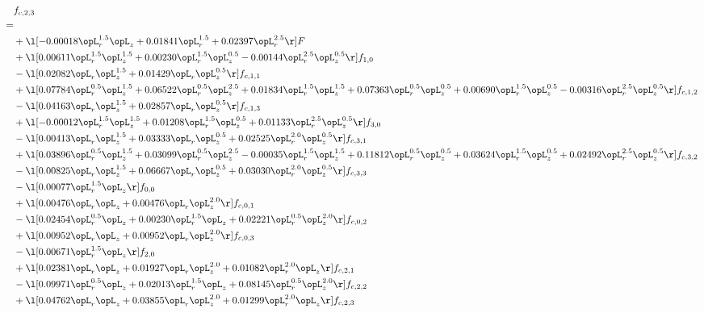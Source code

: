 \begin{alignat}{2} 
\label{eq:f_23_1} 
& f_{c,2,3} \nonumber \\ 
 = \\ 
& + \l[  -0.00018 \opL_r^{1.5} \opL_z +  0.01841 \opL_r^{1.5} +  0.02397 \opL_r^{2.5}  \r] F \nonumber \\ 
& + \l[  0.00611 \opL_r^{1.5} \opL_z^{1.5} +  0.00230 \opL_r^{1.5} \opL_z^{0.5}   -0.00144 \opL_r^{2.5} \opL_z^{0.5}  \r] f_{1,0} \nonumber \\ 
& - \l[  0.02082 \opL_r \opL_z^{1.5} +  0.01429 \opL_r \opL_z^{0.5}  \r] f_{c,1,1} \nonumber \\ 
& + \l[  0.07784 \opL_r^{0.5} \opL_z^{1.5} +  0.06522 \opL_r^{0.5} \opL_z^{2.5} +  0.01834 \opL_r^{1.5} \opL_z^{1.5} +  0.07363 \opL_r^{0.5} \opL_z^{0.5} +  0.00690 \opL_r^{1.5} \opL_z^{0.5}   -0.00316 \opL_r^{2.5} \opL_z^{0.5}  \r] f_{c,1,2} \nonumber \\ 
& - \l[  0.04163 \opL_r \opL_z^{1.5} +  0.02857 \opL_r \opL_z^{0.5}  \r] f_{c,1,3} \nonumber \\ 
& + \l[  -0.00012 \opL_r^{1.5} \opL_z^{1.5} +  0.01208 \opL_r^{1.5} \opL_z^{0.5} +  0.01133 \opL_r^{2.5} \opL_z^{0.5}  \r] f_{3,0} \nonumber \\ 
& - \l[  0.00413 \opL_r \opL_z^{1.5} +  0.03333 \opL_r \opL_z^{0.5} +  0.02525 \opL_r^{2.0} \opL_z^{0.5}  \r] f_{c,3,1} \nonumber \\ 
& + \l[  0.03896 \opL_r^{0.5} \opL_z^{1.5} +  0.03099 \opL_r^{0.5} \opL_z^{2.5}   -0.00035 \opL_r^{1.5} \opL_z^{1.5} +  0.11812 \opL_r^{0.5} \opL_z^{0.5} +  0.03624 \opL_r^{1.5} \opL_z^{0.5} +  0.02492 \opL_r^{2.5} \opL_z^{0.5}  \r] f_{c,3,2} \nonumber \\ 
& - \l[  0.00825 \opL_r \opL_z^{1.5} +  0.06667 \opL_r \opL_z^{0.5} +  0.03030 \opL_r^{2.0} \opL_z^{0.5}  \r] f_{c,3,3} \nonumber \\ 
& - \l[  0.00077 \opL_r^{1.5} \opL_z  \r] f_{0,0} \nonumber \\ 
& + \l[  0.00476 \opL_r \opL_z +  0.00476 \opL_r \opL_z^{2.0}  \r] f_{c,0,1} \nonumber \\ 
& - \l[  0.02454 \opL_r^{0.5} \opL_z +  0.00230 \opL_r^{1.5} \opL_z +  0.02221 \opL_r^{0.5} \opL_z^{2.0}  \r] f_{c,0,2} \nonumber \\ 
& + \l[  0.00952 \opL_r \opL_z +  0.00952 \opL_r \opL_z^{2.0}  \r] f_{c,0,3} \nonumber \\ 
& - \l[  0.00671 \opL_r^{1.5} \opL_z  \r] f_{2,0} \nonumber \\ 
& + \l[  0.02381 \opL_r \opL_z +  0.01927 \opL_r \opL_z^{2.0} +  0.01082 \opL_r^{2.0} \opL_z  \r] f_{c,2,1} \nonumber \\ 
& - \l[  0.09971 \opL_r^{0.5} \opL_z +  0.02013 \opL_r^{1.5} \opL_z +  0.08145 \opL_r^{0.5} \opL_z^{2.0}  \r] f_{c,2,2} \nonumber \\ 
& + \l[  0.04762 \opL_r \opL_z +  0.03855 \opL_r \opL_z^{2.0} +  0.01299 \opL_r^{2.0} \opL_z  \r] f_{c,2,3} \nonumber \\ 
\end{alignat} 


